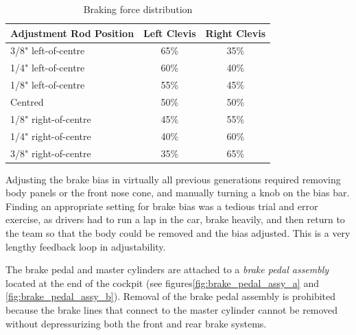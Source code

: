 \begin{table}[H]
	\centering
	\caption{Braking force distribution}
	\label{table:bb_force_distribution}	
	\begin{tabular}{| l | c | c |}
		\hline Adjustment Rod Position & Left Clevis & Right Clevis  \\ \hline
		\hline 3/8" left-of-centre & 65\% & 35\% \\ 
		\hline 1/4" left-of-centre & 60\% & 40\% \\
		\hline 1/8" left-of-centre & 55\% & 45\% \\
		\hline Centred & 50\% & 50\% \\
		\hline 1/8" right-of-centre & 45\% & 55\% \\
		\hline 1/4" right-of-centre & 40\% & 60\% \\
		\hline 3/8" right-of-centre & 35\% & 65\% \\
		\hline
	\end{tabular}
\end{table}

Adjusting the brake bias in virtually all previous generations required removing body panels or the front nose cone, and manually turning a knob on the bias bar. Finding an appropriate setting for brake bias was a tedious trial and error exercise, as drivers had to run a lap in the car, brake heavily, and then return to the team so that the body could be removed and the bias adjusted. This is a very lengthy feedback loop in adjustability.

The brake pedal and master cylinders are attached to a \emph{brake pedal assembly} located at the end of the cockpit (see figures\ref{fig:brake_pedal_assy_a} and \ref{fig:brake_pedal_assy_b}). Removal of the brake pedal assembly is prohibited because the brake lines that connect to the master cylinder cannot be removed without depressurizing both the front and rear brake systems. 

